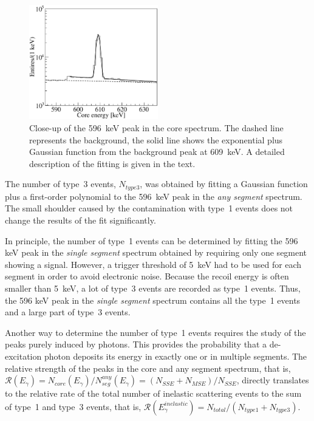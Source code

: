 \begin{figure}[tbhp]
\centering
\includegraphics[width=0.5\textwidth]{fit596}
\caption{Close-up of the 596~keV peak in the core spectrum. The dashed line represents the background, the solid line shows the exponential plus Gaussian function from the background peak at 609~keV. A detailed description of the fitting is given in the text.}
\label{fig:neu:f596}
\end{figure}

The number of type~3 events, $N_{type3}$, was obtained by fitting a Gaussian function plus a first-order polynomial to the 596~keV peak in the \emph{any segment} spectrum. The small shoulder caused by the contamination with type~1 events does not change the results of the fit significantly.

In principle, the number of type~1 events can be determined by fitting the 596 keV peak in the \emph{single segment} spectrum obtained by requiring only one segment showing a signal. However, a trigger threshold of 5~keV had to be used for each segment in order to avoid electronic noise. Because the recoil energy is often smaller than 5~keV, a lot of type~3 events are recorded as type~1 events. Thus, the 596 keV peak in the \emph{single segment} spectrum contains all the type~1 events and a large part of type~3 events.

Another way to determine the number of type~1 events requires the study of the peaks purely induced by photons. This provides the probability that a de-excitation photon deposits its energy in exactly one or in multiple segments. The relative strength of the peaks in the core and any segment spectrum, that is, $\mathcal{R}(E_{\gamma}) = N_{core}(E_{\gamma}) / N^{any}_{seg}(E_{\gamma}) = (N_{SSE} + N_{MSE}) / N_{SSE}$, directly translates to the relative rate of the total number of inelastic scattering events to the sum of type~1 and type~3 events, that is, $\mathcal{R}(E_{\gamma}^{inelastic}) = N_{total} / (N_{type1} + N_{type3})$.

